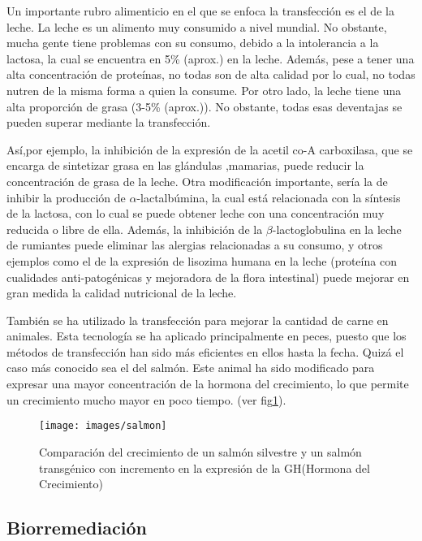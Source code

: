 \documentclass[fleqn,10pt]{SelfArx} %
\begin{document}
Un importante rubro alimenticio en el que se enfoca la transfección es el de la leche. La leche es un alimento muy consumido a nivel mundial. No obstante, mucha gente tiene problemas con su consumo, debido a la intolerancia a la lactosa, la cual se encuentra en 5\% (aprox.) en la leche. Además, pese a tener una alta concentración de proteínas, no todas son de alta calidad por lo cual, no todas nutren de la misma forma a quien la consume. Por otro lado, la leche tiene una alta proporción de grasa (3-5\% (aprox.)). No obstante, todas esas deventajas se pueden superar mediante la transfección\cite{yom1993genetic}. 

Así,por ejemplo, la inhibición de la expresión de la acetil co-A carboxilasa, que se encarga de sintetizar grasa en las glándulas ,mamarias, puede reducir la concentración de grasa de la leche. Otra modificación importante, sería la de inhibir la producción de $\alpha$-lactalbúmina, la cual está relacionada con la síntesis de la lactosa, con lo cual se puede obtener leche con una concentración muy reducida o libre de ella. Además, la inhibición de la $\beta$-lactoglobulina en la leche de rumiantes puede eliminar las alergias relacionadas a su consumo, y otros ejemplos como el de la expresión de lisozima humana en la leche (proteína con cualidades anti-patogénicas y mejoradora de la flora intestinal) puede mejorar en gran medida la calidad nutricional de la leche\cite{yom1993genetic, pintado1998transgenesis, maga2006consumption}.

También se ha utilizado la transfección para mejorar la cantidad de carne en animales. Esta tecnología se ha aplicado principalmente en peces, puesto que los métodos de transfección han sido más eficientes en ellos hasta la fecha. Quizá el caso más conocido sea el del salmón. Este animal ha sido modificado para expresar una mayor concentración de la hormona del crecimiento, lo que permite un crecimiento mucho mayor en poco tiempo. (ver fig\ref{salmon})\cite{berkowitz1994transgenic, ledford2013transgenic}.

\begin{figure}[ht]\centering
\texttt{[image: images/salmon]}
\caption{Comparación del crecimiento de un salmón silvestre y un salmón transgénico con incremento en la expresión de la GH(Hormona del Crecimiento)\cite{berkowitz1994transgenic, ledford2013transgenic}}
\label{salmon}
\end{figure}

\subsection{Biorremediación}
\end{document}
